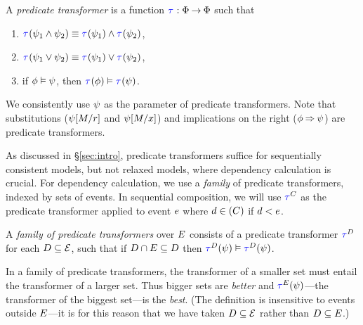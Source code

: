 \begin{definition}
  \label{def:trans}
  A \emph{predicate transformer} is a %
  function
  $\aTr{}{}:\Formulae\fun\Formulae$ such that
  \begin{multicols}{2}
    \begin{enumerate}[,label=(\textsc{x}\arabic*),ref=\textsc{x}\arabic*]
    \item \label{tr-and}
      $\aTr{}{\bForm_1\land\bForm_2}\riff\aTr{}{\bForm_1}\land\aTr{}{\bForm_2}$,    
    \item \label{tr-or}
      $\aTr{}{\bForm_1\lor\bForm_2}\riff\aTr{}{\bForm_1}\lor\aTr{}{\bForm_2}$,
    \item \label{tr-implies}
      if $\phi \mathrel{\vDash} \psi$, then $\aTr{}{\aForm} \rimplies
      \aTr{}{\bForm}$.
    \end{enumerate}
  \end{multicols}
\end{definition}
\noindent
We consistently use $\psi$ as the parameter of predicate transformers.
Note that substitutions ($\psi[M/r]$ and $\psi[M/x]$) and
implications on the right ($\phi\mathbin{\Rightarrow}\psi$) are predicate
transformers.

As discussed in \S\ref{sec:intro}, predicate transformers suffice for
sequentially consistent models, but not relaxed models, where dependency
calculation is crucial.  For dependency calculation, we use a \emph{family}
of predicate transformers, indexed by sets of events. In sequential
composition, we will use $\aTr{\Cdown{\aEv}}{}$ as the predicate transformer
applied to event $e$ where $d\in(C)$ if $d<e$.  %

\begin{definition}
  \label{def:family}
  A \emph{family of predicate transformers} over $E$ consists of a
  predicate transformer $\aTr{\bEvs}{}$ for each $D\subseteq\mathcal{E}$,
  such that if $D \cap E \subseteq D$ then $\aTr{\cEvs}{\bForm}
  \rimplies \aTr{\bEvs}{\bForm}$.
\end{definition}
In a family of predicate transformers, the transformer of a smaller set must
entail the transformer of a larger set.  Thus bigger sets are \emph{better}
and $\aTrAbbrv{\aEvs}{\bForm}$---the transformer of the biggest set---is the
\emph{best}.  (The definition is insensitive to events outside $E$---it
is for this reason that we have taken $D\subseteq\mathcal{E}$ rather than
$D\subseteq E$.)

